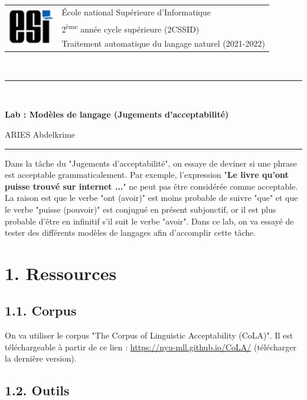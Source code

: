\documentclass[11pt, a4paper]{article}
\begin{document}

\noindent
\begin{tabular}{ll}
\multirow{3}{*}{\includegraphics[width=2cm]{../../img/esi-logo.png}} & \'Ecole national Supérieure d'Informatique\\
& 2\textsuperscript{ème} année cycle supérieure (2CSSID)\\
& Traitement automatique du langage naturel (2021-2022)
\end{tabular}\\[.25cm]
\noindent\rule{\textwidth}{1pt}\\%
\begin{center}
{\LARGE \textbf{Lab : Modèles de langage (Jugements d'acceptabilité)}}
\begin{flushright}
	ARIES Abdelkrime
\end{flushright}
\end{center}
\noindent\rule{\textwidth}{1pt}

Dans la tâche du "Jugements d'acceptabilité", on essaye de deviner si une phrase est acceptable grammaticalement. 
Par exemple, l'expression "\textbf{Le livre qu'ont puisse trouvé sur internet ...}" ne peut pas être considérée comme acceptable. 
La raison est que le verbe "ont (avoir)" est moins probable de suivre "que" et que le verbe "puisse (pouvoir)" est conjugué en présent subjonctif, or il est plus probable d'être en infinitif s'il suit le verbe "avoir".
Dans ce lab, on va essayé de tester des différents modèles de langages afin d'accomplir cette tâche.

\section*{1. Ressources}


\subsection*{1.1. Corpus}

On va utiliser le corpus "The Corpus of Linguistic Acceptability (CoLA)".
Il est téléchargeable à partir de ce lien : \url{https://nyu-mll.github.io/CoLA/} (télécharger la dernière version).



\subsection*{1.2. Outils}
\end{document}
